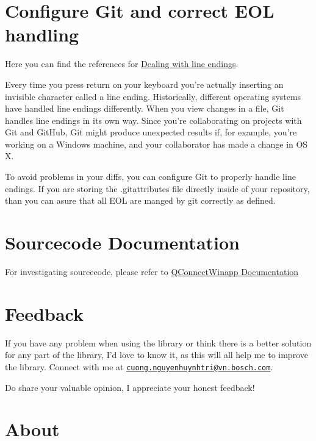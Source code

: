 \hypertarget{configure-git-and-correct-eol-handling}{%
\section{Configure Git and correct EOL
handling}\label{configure-git-and-correct-eol-handling}}

Here you can find the references for
\href{https://help.github.com/articles/dealing-with-line-endings/}{Dealing
with line endings}.

Every time you press return on your keyboard you're actually inserting
an invisible character called a line ending. Historically, different
operating systems have handled line endings differently. When you view
changes in a file, Git handles line endings in its own way. Since you're
collaborating on projects with Git and GitHub, Git might produce
unexpected results if, for example, you're working on a Windows machine,
and your collaborator has made a change in OS X.

To avoid problems in your diffs, you can configure Git to properly
handle line endings. If you are storing the .gitattributes file directly
inside of your repository, than you can asure that all EOL are manged by
git correctly as defined.

\hypertarget{sourcecode-documentation}{%
\section{Sourcecode Documentation}\label{sourcecode-documentation}}

For investigating sourcecode, please refer to
\href{docs/html/index.html}{QConnectWinapp Documentation}

\hypertarget{feedback}{%
\section{Feedback}\label{feedback}}

If you have any problem when using the library or think there is a
better solution for any part of the library, I'd love to know it, as
this will all help me to improve the library. Connect with me at
\href{mailto:cuong.nguyenhuynhtri@vn.bosch.com}{\nolinkurl{cuong.nguyenhuynhtri@vn.bosch.com}}.

Do share your valuable opinion, I appreciate your honest feedback!

\hypertarget{about}{%
\section{About}\label{about}}


